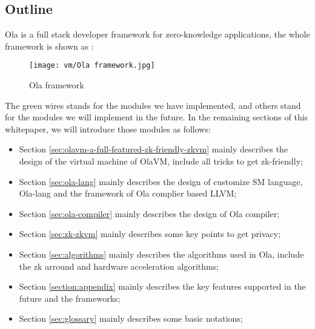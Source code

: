 \subsection{Outline}

Ola is a full stack developer framework for zero-knowledge applications, the whole framework is shown as :
\begin{figure}[!ht]
    \centering
    \texttt{[image: vm/Ola framework.jpg]}
    \caption{Ola framework}
    \label{fig:Ola framework}
\end{figure}

The green wires stands for the modules we have implemented, and others stand for the modules we will implement in the future. In the remaining sections of this whitepaper, we will introduce those modules 
as follows:
\begin{itemize}
    \item Section \ref{sec:olavm-a-full-featured-zk-friendly-zkvm} mainly describes the design of the virtual machine of OlaVM, include all tricks to get zk-friendly;
    \item Section \ref{sec:ola-lang} mainly describes the design of customize SM language, Ola-lang and the framework of Ola complier based LLVM;
    \item Section \ref{sec:ola-compiler} mainly describes the design of Ola compiler;
    \item Section \ref{sec:zk-zkvm} mainly describes some key points to get privacy;
    \item Section \ref{sec:algorithms} mainly describes the algorithms used in Ola, include the zk arround and hardware acceleration algorithms;
    \item Section \ref{section:appendix} mainly describes the key features supported in the future and the frameworks;
    \item Section \ref{sec:glossary} mainly describes some basic notations;
\end{itemize}
